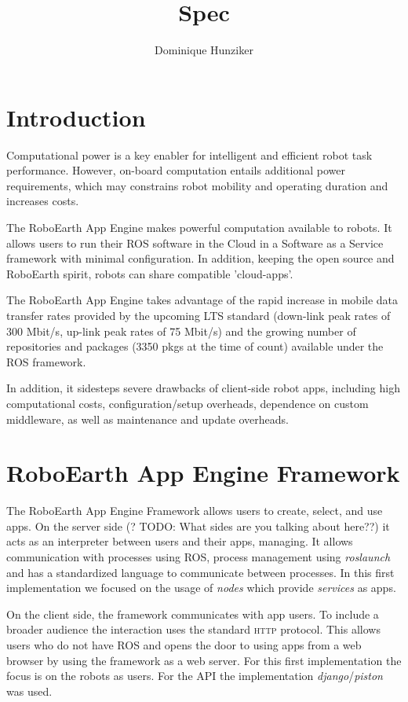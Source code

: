 \documentclass[10pt,a4paper]{article}
\title {Spec}
\author {Dominique Hunziker}
\begin{document}
\section*{Introduction}

		Computational power is a key enabler for 
		intelligent and efficient robot task performance. However, on-board
		computation entails additional power requirements, which may constrains robot mobility and operating duration and increases costs.

The RoboEarth App Engine makes powerful computation available to robots. 
It allows users to run their ROS software in the Cloud in a Software as a Service framework with minimal configuration.
In addition,
		keeping the open source and RoboEarth spirit, robots can share compatible 'cloud-apps'.

The RoboEarth App Engine takes advantage of the rapid increase in mobile data transfer rates provided
		by the upcoming LTS standard (down-link peak rates of 300 Mbit/s,
		up-link peak rates of 75 Mbit/s) and the growing number of
		repositories and packages (3350 pkgs at the time of count) available
		under the ROS framework. 
				
In addition, it sidesteps severe drawbacks of client-side robot apps, including high computational costs, 
configuration/setup overheads, dependence on custom middleware, as well as maintenance and update overheads. 
		
	
	\section*{RoboEarth App Engine Framework}
		The RoboEarth App Engine Framework allows users to create, select, and use apps.
		On the server side (? TODO: What sides are you talking about here??) it acts as an interpreter between users and their apps, managing. It allows 
communication with processes using \textsc{ROS}, process management
		using \emph{roslaunch} and has a standardized language to communicate between
		processes. In this first implementation we focused on the usage of \emph{nodes} which provide
		\emph{services} as apps.
		
		On the client side, the framework communicates with app users. 
To include a broader audience the interaction uses the standard \textsc{http} protocol.
		This allows users who do not have \textsc{ROS} and opens the door to using apps from
		a web browser by using the framework as a web server. For this first
		implementation the focus is on the robots as users. For the API 
		the implementation \emph{django}/\emph{piston} was used.
	
\end{document}
